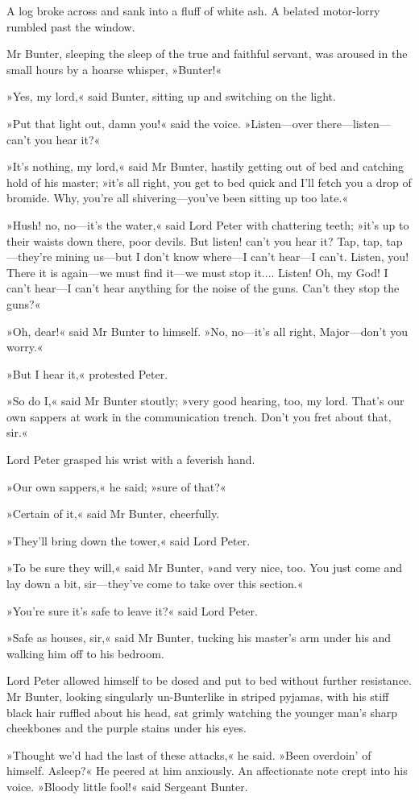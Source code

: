 A log broke across and sank into a fluff of white ash. A belated motor-lorry rumbled past the window.

Mr Bunter, sleeping the sleep of the true and faithful servant, was aroused in the small hours by a hoarse whisper, »Bunter!«

»Yes, my lord,« said Bunter, sitting up and switching on the light.

»Put that light out, damn you!« said the voice. »Listen—over there—listen—can't you hear it?«

»It's nothing, my lord,« said Mr Bunter, hastily getting out of bed and catching hold of his master; »it's all right, you get to bed quick and I'll fetch you a drop of bromide. Why, you're all shivering—you've been sitting up too late.«

»Hush! no, no—it's the water,« said Lord Peter with chattering teeth; »it's up to their waists down there, poor devils. But listen! can't you hear it? Tap, tap, tap—they're mining us—but I don't know where—I can't hear—I can't. Listen, you! There it is again—we must find it—we must stop it.... Listen! Oh, my God! I can't hear—I can't hear anything for the noise of the guns. Can't they stop the guns?«

»Oh, dear!« said Mr Bunter to himself. »No, no—it's all right, Major—don't you worry.«

»But I hear it,« protested Peter.

»So do I,« said Mr Bunter stoutly; »very good hearing, too, my lord. That's our own sappers at work in the communication trench. Don't you fret about that, sir.«

Lord Peter grasped his wrist with a feverish hand.

»Our own sappers,« he said; »sure of that?«

»Certain of it,« said Mr Bunter, cheerfully.

»They'll bring down the tower,« said Lord Peter.

»To be sure they will,« said Mr Bunter, »and very nice, too. You just come and lay down a bit, sir—they've come to take over this section.«

»You're sure it's safe to leave it?« said Lord Peter.

»Safe as houses, sir,« said Mr Bunter, tucking his master's arm under his and walking him off to his bedroom.

Lord Peter allowed himself to be dosed and put to bed without further resistance. Mr Bunter, looking singularly un-Bunterlike in striped pyjamas, with his stiff black hair ruffled about his head, sat grimly watching the younger man's sharp cheekbones and the purple stains under his eyes.

»Thought we'd had the last of these attacks,« he said. »Been overdoin' of himself. Asleep?« He peered at him anxiously. An affectionate note crept into his voice. »Bloody little fool!« said Sergeant Bunter.